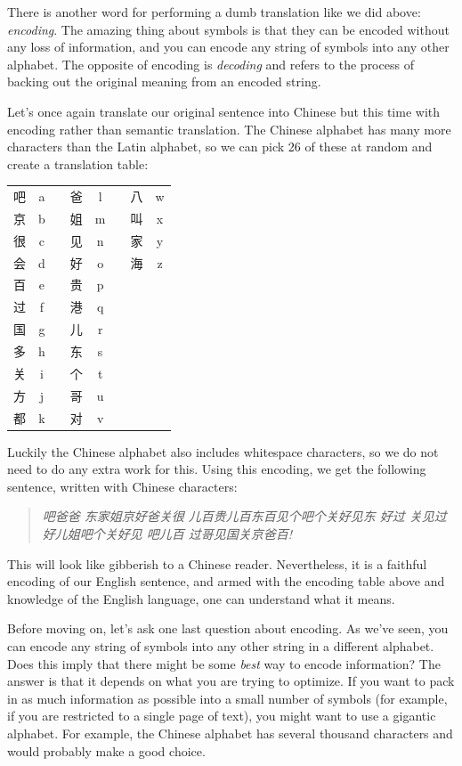\documentclass[UTF8]{book}
\begin{document}
\begin{CJK}{UTF8}{gbsn}
There is another word for performing a dumb translation like we did above: \emph{encoding}. The amazing thing about symbols is that they can be encoded without any loss of information, and you can encode any string of symbols into any other alphabet. The opposite of encoding is \emph{decoding} and refers to the process of backing out the original meaning from an encoded string.

Let's once again translate our original sentence into Chinese but this time with encoding rather than semantic translation. The Chinese alphabet has many more characters than the Latin alphabet, so we can pick 26 of these at random and create a translation table:

\begin{center}
\begin{tabular}{ cccccccc }
 吧 & a & & 爸 & l & & 八 & w \\
 京 & b & & 姐 & m & & 叫 & x \\
 很 & c & & 见 & n & & 家 & y \\
 会 & d & & 好 & o & & 海 & z \\
 百 & e & & 贵 & p & & \\
 过 & f & & 港 & q & & \\
 国 & g & & 儿 & r & & \\
 多 & h & & 东 & s & & \\
 关 & i & & 个 & t & & \\
 方 & j & & 哥 & u & & \\
 都 & k & & 对 & v & & \\
\end{tabular}
\end{center}

Luckily the Chinese alphabet also includes whitespace characters, so we do not need to do any extra work for this. Using this encoding, we get the following sentence, written with Chinese characters:

\begin{quotation}
\centering
\emph{吧爸爸 东家姐京好爸关很 儿百贵儿百东百见个吧个关好见东 好过 关见过好儿姐吧个关好见 吧儿百 过哥见国关京爸百!}
\end{quotation}

This will look like gibberish to a Chinese reader. Nevertheless, it is a faithful encoding of our English sentence, and armed with the encoding table above and knowledge of the English language, one can understand what it means.

Before moving on, let's ask one last question about encoding. As we've seen, you can encode any string of symbols into any other string in a different alphabet. Does this imply that there might be some \emph{best} way to encode information? The answer is that it depends on what you are trying to optimize. If you want to pack in as much information as possible into a small number of symbols (for example, if you are restricted to a single page of text), you might want to use a gigantic alphabet. For example, the Chinese alphabet has several thousand characters and would probably make a good choice.


\end{CJK}
\end{document}
